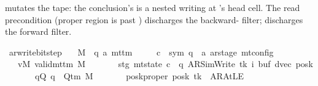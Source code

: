 \begin{isabellebody}
\begin{isamarkuptext}
  mutates the tape: the conclusion's  is a nested
   writing  at
  's head cell.  The read precondition 
  (proper region is past ) discharges the backward-
  filter;  discharges the forward filter.%
\end{isamarkuptext}\isamarkuptrue%
\isamarkupfalse%
\ ar{\isacharunderscore}{\kern0pt}write{\isacharunderscore}{\kern0pt}bit{\isacharunderscore}{\kern0pt}step{\isacharcolon}{\kern0pt}\isanewline
\ \ \ M\ {\isacharcolon}{\kern0pt}{\isacharcolon}{\kern0pt}\ {\isachardoublequoteopen}{\isacharparenleft}{\kern0pt}{\isacharprime}{\kern0pt}q{\isacharcomma}{\kern0pt}\ {\isacharprime}{\kern0pt}a{\isacharparenright}{\kern0pt}\ mttm{\isachardoublequoteclose}\isanewline
\ \ \ \ \ c{\isacharprime}{\kern0pt}\ {\isacharcolon}{\kern0pt}{\isacharcolon}{\kern0pt}\ {\isachardoublequoteopen}{\isacharparenleft}{\kern0pt}sym{}{\isacharcomma}{\kern0pt}\ {\isacharprime}{\kern0pt}q\ {\isasymtimes}\ {\isacharprime}{\kern0pt}a\ ar{\isacharunderscore}{\kern0pt}stage{\isacharparenright}{\kern0pt}\ mt{\isacharunderscore}{\kern0pt}config{\isachardoublequoteclose}\isanewline
\ \ \ vM{\isacharcolon}{\kern0pt}\ {\isachardoublequoteopen}valid{\isacharunderscore}{\kern0pt}mttm\ M{\isachardoublequoteclose}\isanewline
\ \ \ \ \ \ \ stg{\isacharcolon}{\kern0pt}\ {\isachardoublequoteopen}mt{\isacharunderscore}{\kern0pt}state\ c{\isacharprime}{\kern0pt}\ {\isacharequal}{\kern0pt}\ {\isacharparenleft}{\kern0pt}q{\isacharcomma}{\kern0pt}\ AR{\isacharunderscore}{\kern0pt}SimWrite{\isacharcomma}{\kern0pt}\ tk{\isacharcomma}{\kern0pt}\ i{\isacharcomma}{\kern0pt}\ buf{\isacharcomma}{\kern0pt}\ dvec{\isacharcomma}{\kern0pt}\ posk{\isacharparenright}{\kern0pt}{\isachardoublequoteclose}\isanewline
\ \ \ \ \ \ \ qQ{\isacharcolon}{\kern0pt}\ {\isachardoublequoteopen}q\ {\isasymin}\ Q{\isacharunderscore}{\kern0pt}tm\ M{\isachardoublequoteclose}\isanewline
\ \ \ \ \ \ \ poskproper{\isacharcolon}{\kern0pt}\ {\isachardoublequoteopen}posk\ tk\ {\isasymnoteq}\ AR{\isacharunderscore}{\kern0pt}AtLE{\isachardoublequoteclose}\isanewline

\end{isabellebody}
